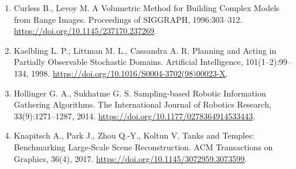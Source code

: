 \documentclass[11pt,a4paper]{article}
\begin{document}
\begin{enumerate}
  Placed J. A., Strader J., Carrillo H., Atanasov N., Indelman V., Carlone L., Castellanos J. A. A Survey on Active Simultaneous Localization and Mapping: State of the Art and New Frontiers. IEEE Transactions on Robotics, 2023. \url{https://doi.org/10.1109/TRO.2023.3248510}.
\item
  Curless B., Levoy M. A Volumetric Method for Building Complex Models from Range Images. Proceedings of SIGGRAPH, 1996:303--312. \url{https://doi.org/10.1145/237170.237269}.
\item
  Kaelbling L. P., Littman M. L., Cassandra A. R. Planning and Acting in Partially Observable Stochastic Domains. Artificial Intelligence, 101(1--2):99--134, 1998. \url{https://doi.org/10.1016/S0004-3702(98)00023-X}.
\item
  Hollinger G. A., Sukhatme G. S. Sampling-based Robotic Information Gathering Algorithms. The International Journal of Robotics Research, 33(9):1271--1287, 2014. \url{https://doi.org/10.1177/0278364914533443}.
\item
  Knapitsch A., Park J., Zhou Q.-Y., Koltun V. Tanks and Temples: Benchmarking Large-Scale Scene Reconstruction. ACM Transactions on Graphics, 36(4), 2017. \url{https://doi.org/10.1145/3072959.3073599}.
\end{enumerate}
\end{document}

